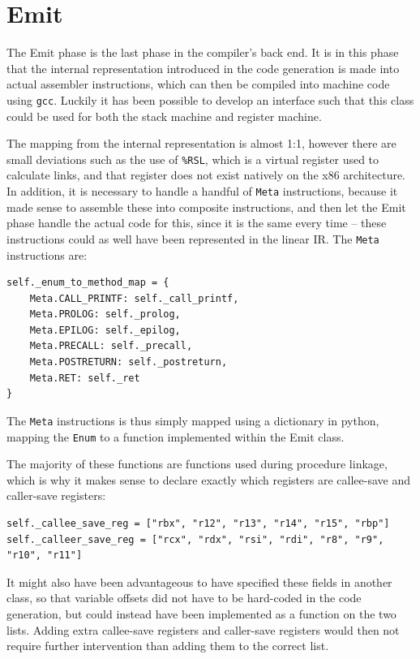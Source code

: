 \section{Emit}
The Emit phase is the last phase in the compiler's back end. It is in this phase that the internal representation introduced in the code generation is made into actual assembler instructions, which can then be compiled into machine code using \texttt{gcc}. Luckily it has been possible to develop an interface such that this class could be used for both the stack machine and register machine.

The mapping from the internal representation is almost 1:1, however there are small deviations such as the use of \texttt{\%RSL}, which is a virtual register used to calculate links, and that register does not exist natively on the x86 architecture. In addition, it is necessary to handle a handful of \texttt{Meta} instructions, because it made sense to assemble these into composite instructions, and then let the Emit phase handle the actual code for this, since it is the same every time -- these instructions could as well have been represented in the linear IR. The \texttt{Meta} instructions are:

\begin{verbatim}
self._enum_to_method_map = {
    Meta.CALL_PRINTF: self._call_printf,
    Meta.PROLOG: self._prolog,
    Meta.EPILOG: self._epilog,
    Meta.PRECALL: self._precall,
    Meta.POSTRETURN: self._postreturn,
    Meta.RET: self._ret
}
\end{verbatim}

The \texttt{Meta} instructions is thus simply mapped using a dictionary in python, mapping the \texttt{Enum} to a function implemented within the Emit class.

The majority of these functions are functions used during procedure linkage, which is why it makes sense to declare exactly which registers are callee-save and caller-save registers:

\begin{verbatim}
self._callee_save_reg = ["rbx", "r12", "r13", "r14", "r15", "rbp"]
self._calleer_save_reg = ["rcx", "rdx", "rsi", "rdi", "r8", "r9", "r10", "r11"]
\end{verbatim}

It might also have been advantageous to have specified these fields in another class, so that variable offsets did not have to be hard-coded in the code generation, but could instead have been implemented as a function on the two lists. Adding extra callee-save registers and caller-save registers would then not require further intervention than adding them to the correct list.

